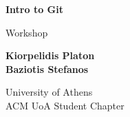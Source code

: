 \begin{titlepage}
	\begin{center}
		\vspace*{1cm}
		\Huge
		\textbf{{\la Intro to Git}}
		
		\vspace{0.5cm}
		\LARGE
		{\sf \la Workshop}

		\vspace{1.5cm}
		\large
		\textbf{\la Kiorpelidis Platon}\\
		\textbf{\la Baziotis Stefanos}

		\vfill
		

		\LARGE
		{\sf \la University of Athens}\\
		{\sf \la ACM UoA Student Chapter}

	\end{center}
\end{titlepage}
